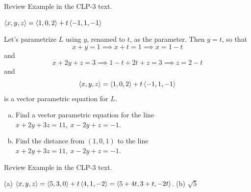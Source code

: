 \begin{hint}
Review Example  in the CLP-3 text.
\end{hint}

\begin{answer}
$\left< x,y,z\right> = \left< 1,0,2\right> +t\left<-1,1,-1 \right>$
\end{answer}

\begin{solution}
Let's parametrize $L$ using $y$, renamed to $t$, as the parameter.
Then $y=t$, so that 
\begin{equation*}
x+y=1
\implies x+t=1
\implies x=1-t
\end{equation*}
and
\begin{equation*}
x+2y+z=3
\implies
1-t + 2t +z =3
\implies z = 2-t
\end{equation*}
and
\begin{equation*}
\left< x,y,z\right> = \left< 1,0,2\right> +t\left<-1,1,-1 \right>
\end{equation*}
is a vector parametric equation for $L$.
\end{solution}

\begin{question}
\begin{enumerate}[(a)]
\item
Find a vector parametric equation for the line
$x+2y+3z=11,\ x-2y+z=-1$. 
\item
Find the distance from $(1,0,1)$ to the line
$x+2y+3z=11,\ x-2y+z=-1$. 
\end{enumerate}
\end{question}

\begin{hint}
Review Example  in the CLP-3 text.
\end{hint}

\begin{answer}
(a) $\left< x,y,z\right>=\left< 5,3,0\right>+t\left< 4,1,-2\right> =\left< 5+4t,3+t,-2t\right>$.
\qquad
(b) $\sqrt{5}$
\end{answer}

